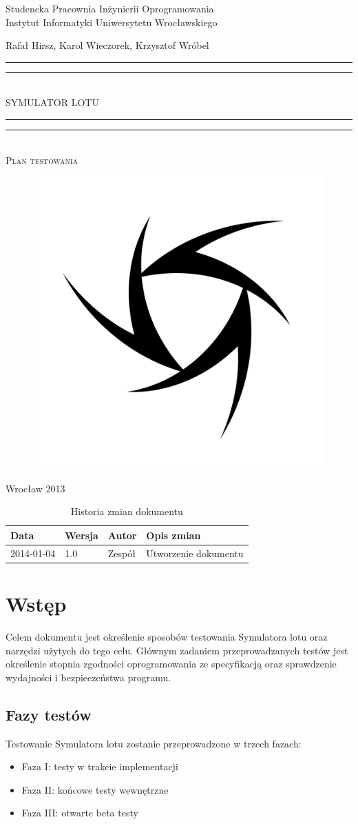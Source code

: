 \documentclass{mwrep}
\newcommand*{\titleGP}{\begingroup
\centering

{\large Studencka Pracownia Inżynierii Oprogramowania}\\Instytut Informatyki Uniwersytetu Wrocławskiego\par
\vspace*{16\baselineskip}

{\Large Rafał Hirsz, Karol Wieczorek, Krzysztof Wróbel\par}
\vspace*{\baselineskip}

\rule{\textwidth}{1.6pt}\vspace*{-\baselineskip}\vspace*{2pt}
\rule{\textwidth}{0.4pt}\\[\baselineskip]

{\Huge SYMULATOR LOTU}\\[0.2\baselineskip]

\rule{\textwidth}{0.4pt}\vspace*{-\baselineskip}\vspace{3.2pt}
\rule{\textwidth}{1.6pt}\\[\baselineskip]

\scshape
{\huge Plan testowania}\par
\vspace*{2\baselineskip}

\begin{figure}[h]
\centering
\includegraphics[width=5\baselineskip]{flightsim-team-logo.pdf}
\end{figure}
\vfill

{\large Wrocław 2013}\par

\pagebreak

\endgroup}
\begin{document}
\thispagestyle{empty}
\titleGP

\begin{center}
\begin{table}[h]
\begin{center}
\begin{tabularx}{1\textwidth}{|l|l|l|X|}
\hline
Data & Wersja & Autor & Opis zmian \\ \hline
2014-01-04 & 1.0 & Zespół & Utworzenie dokumentu \\
\hline
\end{tabularx}
\end{center}
\vspace{3ex}
\caption{Historia zmian dokumentu}\label{T:Zmiany}
\end{table}
\end{center}

\pagebreak

\tableofcontents

\chapter{Wstęp}
Celem dokumentu jest określenie sposobów testowania Symulatora lotu oraz narzędzi użytych do tego celu. Głównym zadaniem przeprowadzanych testów jest określenie stopnia zgodności oprogramowania ze specyfikacją oraz sprawdzenie wydajności i bezpieczeństwa programu.

\section{Fazy testów}
Testowanie Symulatora lotu zostanie przeprowadzone w trzech fazach:
\begin{itemize}
  \item Faza I: testy w trakcie implementacji
  \item Faza II: końcowe testy wewnętrzne
  \item Faza III: otwarte beta testy
\end{itemize}
\end{document}
